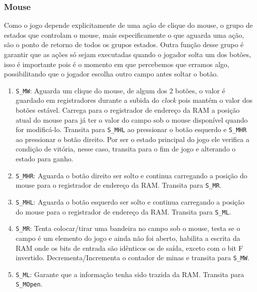 \documentclass[12pt]{article}
\begin{document}

\subsubsection{Mouse}
\label{sec:mouse}

Como o jogo depende explicitamente de uma ação de clique do mouse, o grupo de
estados que controlam o mouse, mais especificamente o que aguarda uma ação, são
o ponto de retorno de todos os grupos estados. Outra função desse grupo é
garantir que as ações só sejam executadas quando o jogador solta um dos botões,
isso é importante pois é o momento em que percebemos que erramos algo, 
possibilitando que o jogador escolha outro campo antes soltar o botão.

\begin{enumerate}

\item \verb|S_MW|: Aguarda um clique do mouse, de algum dos 2 botões, o valor é
	guardado em registradores durante a subida do \emph{clock} pois mantém o 
	valor dos botões estável. Carrega para o registrador de endereço da RAM a
	posição atual do mouse para já ter o valor do campo sob o mouse disponível
	quando for modificá-lo. Transita para \verb|S_MHL| ao pressionar o botão
	esquerdo e \verb|S_MHR| ao pressionar o botão direito. Por ser o estado
	principal do jogo ele verifica a condição de vitória, nesse caso, transita
	para o fim de jogo e alterando o estado para ganho.
	
\item \verb|S_MHR|: Aguarda o botão direito ser solto e continua carregando a
	posição do mouse para o registrador de endereço da RAM. 
	Transita para \verb|S_MR|.
	
\item \verb|S_MHL|: Aguarda o botão esquerdo ser solto e continua carregando a
	posição do mouse para o registrador de endereço da RAM. 
	Transita para \verb|S_ML|.
	
\item \verb|S_MR|: Tenta colocar/tirar uma bandeira no campo sob o mouse, testa
	se o campo é um elemento do jogo e ainda não foi aberto, habilita a escrita
	da RAM onde os bits de entrada são idênticos os de saída, exceto com o bit 
	F invertido. Decrementa/Incrementa o contador de minas e transita para 
	\verb|S_MW|.
	
\item \verb|S_ML|: Garante que a informação tenha sido trazida da RAM.
	Transita para \verb|S_MOpen|.


\end{enumerate}
\end{document}
